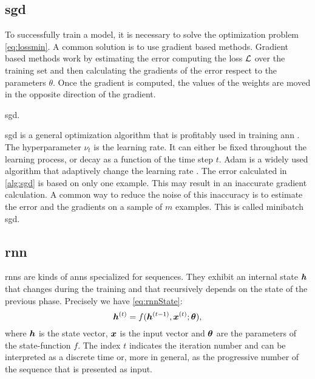 \subsection{\acf{sgd}}
\label{sec:sgd}
To successfully train a model, it is necessary to solve the
optimization problem \eqref{eq:lossmin}. A common solution is to use
gradient based methods. Gradient based methods work by estimating the
error computing the loss $\mathcal{L}$ over the training set and then
calculating the 
gradients of the error respect to the parameters $\theta$. Once the
gradient is computed, the values of the weights are moved in the
opposite direction of the gradient.

\begin{algorithm}
  \caption{\acf{sgd}.}\label{alg:sgd}
\end{algorithm}
\acf{sgd} is a general
optimization algorithm that is profitably used in training \ac{ann}
\cite{bottou2012stochastic,lecun1995convolutional}.
The hyperparameter $\nu_t$ is the learning rate. It can either be
fixed throughout the learning process, or decay as a function of the
time step $t$. Adam is a widely used algorithm that adaptively change
the learning rate \cite{kingma2014adam}. The error calculated in
\cref{alg:sgd} is based on only one example. This may result in
an inaccurate gradient calculation. A common way to reduce the noise of
this inaccuracy is to estimate the error and the gradients on a sample
of $m$ examples. This is called minibatch \ac{sgd}.

\subsection{\acf{rnn}}
\acp{rnn} are kinds of \acp{ann} specialized for sequences. They
exhibit an
internal state $\bm{h}$ that changes during the training and that
recursively depends on the state of the previous phase. Precisely we
have \cref{eq:rnnState}:
\begin{equation}\label{eq:rnnState}
  \bm{h}^{(t)} = f(\bm{h}^{(t-1)}, \bm{x}^{(t)}; \bm{\theta}),
\end{equation}
where $\bm{h}$ is the state vector, $\bm{x}$ is the input vector
and $\bm{\theta}$ are the parameters of the state-function
$f$. The index $t$ indicates 
the iteration number and can be interpreted as a discrete time or,
more in general, as the progressive number of the sequence that is
presented as
input.

